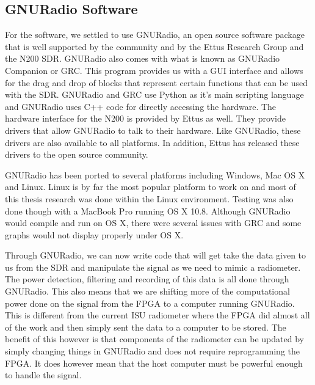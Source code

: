 \subsection{GNURadio Software}

For the software, we settled to use GNURadio, an open source software package that is well supported by the community and by the Ettus Research Group and the N200 SDR.  GNURadio also comes with what is known as GNURadio Companion or GRC.  This program provides us with a GUI interface and allows for the drag and drop of blocks that represent certain functions that can be used with the SDR.  GNURadio and GRC use Python as it's main scripting language and GNURadio uses C++ code for directly accessing the hardware.  The hardware interface for the N200 is provided by Ettus as well.  They provide drivers that allow GNURadio to talk to their hardware.  Like GNURadio, these drivers are also available to all platforms.  In addition, Ettus has released these drivers to the open source community.

GNURadio has been ported to several platforms including Windows, Mac OS X and Linux.  Linux is by far the most popular platform to work on and most of this thesis research was done within the Linux environment.  Testing was also done though with a MacBook Pro running OS X 10.8.  Although GNURadio would compile and run on OS X, there were several issues with GRC and some graphs would not display properly under OS X.  

Through GNURadio, we can now write code that will get take the data given to us from the SDR and manipulate the signal as we need to mimic a radiometer.  The power detection, filtering and recording of this data is all done through GNURadio.  This also means that we are shifting more of the computational power done on the signal from the FPGA to a computer running GNURadio.  This is different from the current ISU radiometer where the FPGA did almost all of the work and then simply sent the data to a computer to be stored.  The benefit of this however is that components of the radiometer can be updated by simply changing things in GNURadio and does not require reprogramming the FPGA.  It does however mean that the host computer must be powerful enough to handle the signal.  


